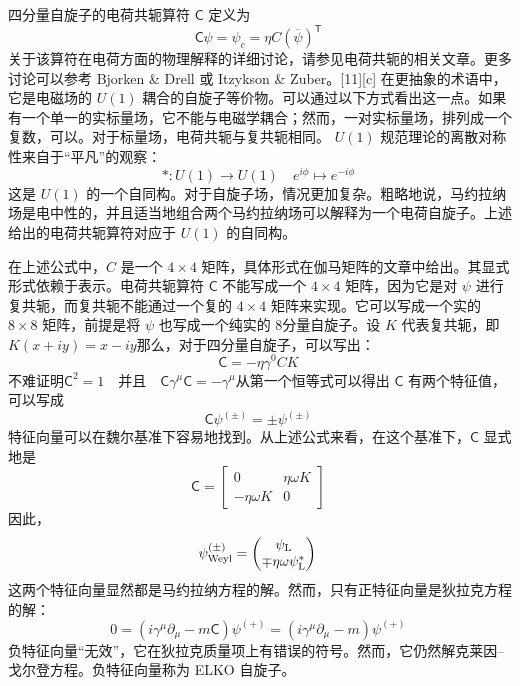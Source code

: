 四分量自旋子的电荷共轭算符 \(\mathsf{C}\) 定义为
\[
\mathsf{C} \psi = \psi_{c} = \eta C \left( \overline{\psi} \right)^{\textsf{T}}~
\]
关于该算符在电荷方面的物理解释的详细讨论，请参见电荷共轭的相关文章。更多讨论可以参考 Bjorken & Drell 或 Itzykson & Zuber。[11][c] 在更抽象的术语中，它是电磁场的 \( U(1) \) 耦合的自旋子等价物。可以通过以下方式看出这一点。如果有一个单一的实标量场，它不能与电磁学耦合；然而，一对实标量场，排列成一个复数，可以。对于标量场，电荷共轭与复共轭相同。 \( U(1) \) 规范理论的离散对称性来自于“平凡”的观察：
\[
*: U(1) \to U(1) \quad e^{i\phi} \mapsto e^{-i\phi}~
\]
这是 \( U(1) \) 的一个自同构。对于自旋子场，情况更加复杂。粗略地说，马约拉纳场是电中性的，并且适当地组合两个马约拉纳场可以解释为一个电荷自旋子。上述给出的电荷共轭算符对应于 \( U(1) \) 的自同构。

在上述公式中，\( C \) 是一个 \( 4 \times 4 \) 矩阵，具体形式在伽马矩阵的文章中给出。其显式形式依赖于表示。电荷共轭算符 \(\mathsf{C}\) 不能写成一个 \( 4 \times 4 \) 矩阵，因为它是对 \(\psi\) 进行复共轭，而复共轭不能通过一个复的 \( 4 \times 4 \) 矩阵来实现。它可以写成一个实的 \( 8 \times 8 \) 矩阵，前提是将 \(\psi\) 也写成一个纯实的 8分量自旋子。设 \( K \) 代表复共轭，即\(K(x + iy) = x - iy\)那么，对于四分量自旋子，可以写出：
\[
\mathsf{C} = -\eta \gamma^0 C K~
\]
不难证明\(\mathsf{C}^2 = 1 \quad \text{并且} \quad \mathsf{C} \gamma^{\mu} \mathsf{C} = -\gamma^{\mu}\)从第一个恒等式可以得出 \(\mathsf{C}\) 有两个特征值，可以写成
\[
\mathsf{C} \psi^{(\pm)} = \pm \psi^{(\pm)}~
\]
特征向量可以在魏尔基准下容易地找到。从上述公式来看，在这个基准下，\(\mathsf{C}\) 显式地是
\[
\mathsf{C} = \begin{bmatrix} 0 & \eta \omega K \\ -\eta \omega K & 0 \end{bmatrix}~
\]
因此，
\[
\psi_{\text{Weyl}}^{(\pm)} = \begin{pmatrix} \psi_{\rm{L}} \\ \mp \eta \omega \psi_{\rm{L}}^{*} \end{pmatrix}~
\]
这两个特征向量显然都是马约拉纳方程的解。然而，只有正特征向量是狄拉克方程的解：
\[
0 = \left( i \gamma^{\mu} \partial_{\mu} - m \mathsf{C} \right) \psi^{(+)} = \left( i \gamma^{\mu} \partial_{\mu} - m \right) \psi^{(+)}~
\]
负特征向量“无效”，它在狄拉克质量项上有错误的符号。然而，它仍然解克莱因–戈尔登方程。负特征向量称为 ELKO 自旋子。